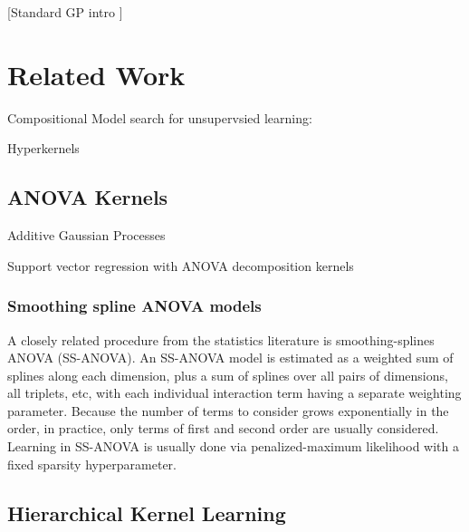 \documentclass[twoside]{article}
\theoremstyle{definition}
\theoremstyle{remark}
\numberwithin{equation}{section}
\numberwithin{thm}{section}
\begin{document}
[Standard GP intro \cite{rasmussen38gaussian}]


\section{Related Work}

Compositional Model search for unsupervsied learning: \cite{grosse2012exploiting}

Hyperkernels \cite{ong2002hyperkernels}

\subsection{ANOVA Kernels}

Additive Gaussian Processes \cite{duvenaud2011additive11}

Support vector regression with ANOVA decomposition kernels \cite{stitson1999support}

\subsubsection{Smoothing spline ANOVA models}

A closely related procedure from the statistics literature is smoothing-splines ANOVA (SS-ANOVA)\cite{wahba1990spline, gu2002smoothing}. An SS-ANOVA model is estimated as a weighted sum of splines along each dimension, plus a sum of splines over all pairs of dimensions, all triplets, etc, with each individual interaction term having a separate weighting parameter.  Because the number of terms to consider grows exponentially in the order, in practice, only terms of first and second order are usually considered.  Learning in SS-ANOVA is usually done via penalized-maximum likelihood with a fixed sparsity hyperparameter.

\subsection{Hierarchical Kernel Learning}
\end{document}
